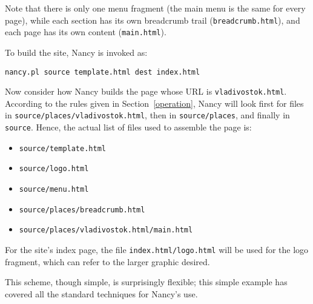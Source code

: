 \documentclass[english]{scrartcl}
\begin{document}
Note that there is only one menu fragment (the main menu is the same for every page), while each section has its own breadcrumb trail (\verb|breadcrumb.html|), and each page has its own content (\verb|main.html|).

To build the site, Nancy is invoked as:

\begin{verbatim}
nancy.pl source template.html dest index.html
\end{verbatim}

Now consider how Nancy builds the page whose URL is \verb|vladivostok.html|. According to the rules given in Section~\ref{operation}, Nancy will look first for files in \verb|source/places/vladivostok.html|, then in \verb|source/places|, and finally in \verb|source|. Hence, the actual list of files used to assemble the page is:

\begin{itemize}
\item \verb|source/template.html|
\item \verb|source/logo.html|
\item \verb|source/menu.html|
\item \verb|source/places/breadcrumb.html|
\item \verb|source/places/vladivostok.html/main.html|
\end{itemize}

For the site's index page, the file \verb|index.html/logo.html| will be used for the logo fragment, which can refer to the larger graphic desired.

This scheme, though simple, is surprisingly flexible; this simple example has covered all the standard techniques for Nancy's use.
\end{document}
